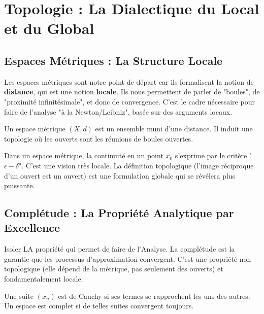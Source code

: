 \chapter{Topologie : La Dialectique du Local et du Global}

\section{Espaces Métriques : La Structure Locale}

\begin{objectif}
    Les espaces métriques sont notre point de départ car ils formalisent la notion de \textbf{distance}, qui est une notion \textbf{locale}. Ils nous permettent de parler de "boules", de "proximité infinitésimale", et donc de convergence. C'est le cadre nécessaire pour faire de l'analyse "à la Newton/Leibniz", basée sur des arguments locaux.
\end{objectif}

\begin{definition}
    Un espace métrique $(X, d)$ est un ensemble muni d'une distance. Il induit une topologie où les ouverts sont les réunions de boules ouvertes.
\end{definition}

\begin{definition}
    Dans un espace métrique, la continuité en un point $x_0$ s'exprime par le critère "$\epsilon-\delta$". C'est une vision très locale. La définition topologique (l'image réciproque d'un ouvert est un ouvert) est une formulation globale qui se révélera plus puissante.
\end{definition}

\section{Complétude : La Propriété Analytique par Excellence}

\begin{objectif}
    Isoler LA propriété qui permet de faire de l'Analyse. La complétude est la garantie que les processus d'approximation convergent. C'est une propriété non-topologique (elle dépend de la métrique, pas seulement des ouverts) et fondamentalement locale.
\end{objectif}

\begin{definition}
    Une suite $(x_n)$ est de Cauchy si ses termes se rapprochent les uns des autres. Un espace est complet si de telles suites convergent toujours.
\end{definition}

